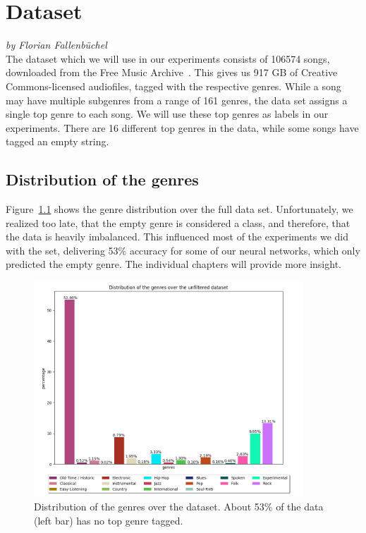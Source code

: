 \chapter{Dataset}\label{dataset}
\textit{by Florian Fallenbüchel}\\

The dataset which we will use in our experiments consists of 106574
songs, downloaded from the Free Music Archive~\cite{fma_dataset}. This
gives us 917 GB of Creative Commons-licensed audiofiles, tagged with the
respective genres. While a song may have multiple subgenres from a range
of 161 genres, the data set assigns a single top genre to each song. We
will use these top genres as labels in our experiments. There are 16
different top genres in the data, while some songs have tagged an empty
string.

\section{Distribution of the genres}

Figure~\ref{unfiltered} shows the genre distribution over the
full data set. Unfortunately, we realized too late, that the empty genre
is considered a class, and therefore, that the data is heavily
imbalanced. This influenced most of the experiments we did with the set,
delivering 53$\%$ accuracy for some of our neural networks, which only
predicted the empty genre. The individual chapters will provide more
insight.
\begin{figure}[!htb]
	\centering
	\includegraphics[width=0.9\textwidth]{images/genredist.png}
	\caption{Distribution of the genres over the dataset.
	About 53$\%$ of the data (left bar) has no top genre tagged.}
	\label{unfiltered}
\end{figure}


